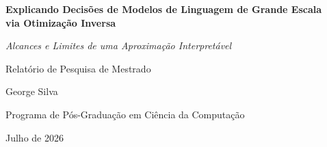 \documentclass[12pt,a4paper]{article}
\begin{document}
\begin{titlepage}
  \centering
  \vspace*{2cm}
  {\Large\bfseries Explicando Decisões de Modelos de Linguagem de Grande Escala\\
  via Otimização Inversa\par}
  \vspace{0.6cm}
  {\large\itshape Alcances e Limites de uma Aproximação Interpretável\par}
  \vspace{1.5cm}
  {\large Relatório de Pesquisa de Mestrado\par}
  \vspace{1cm}
  {\large George Silva\par}
  \vspace{0.5cm}
  {\normalsize Programa de Pós-Graduação em Ciência da Computação\par}
  \vfill
  {\normalsize Julho de 2026\par}
\end{titlepage}
\end{document}
